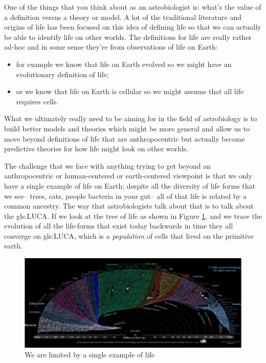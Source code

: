 \documentclass[]{article}
\begin{document}
One of the things that  you think about as
an astrobiologist is: what's the
value of a definition versus a theory or
model. A lot of the traditional
literature and origins of life has been
focused on this idea of defining life so
that we can actually be able to identify
life on other worlds. The definitions
for life are really rather ad-hoc and in
some sense they're  from
observations of life on Earth:
\begin{itemize}
	\item  for example we know that life on Earth evolved so we might have an evolutionary definition of life;
	\item or we know that life on Earth is cellular so we might assume that all life requires cells.
\end{itemize}

What we ultimately really need to be aiming for
in the field of astrobiology is to build
better models and theories which might
be more general and allow us to move
beyond definitions of life that are
anthropocentric but
actually become predictive theories for
how life might look on other worlds.

The challenge that we face with anything
trying to get beyond an anthropocentric
or human-centered or earth-centered
viewpoint is that we only have a single
example of life on Earth; despite all
the diversity of life forms that we see--
trees, cats, people bacteria in your gut--
all of that life is related by a common ancestry.
The way that astrobiologists talk
about that is to talk about
the \gls{gls:LUCA}.
If we look at the tree of life
as shown in Figure \ref{fig:yatol}, and we trace
the evolution of all the life-forms that
exist today backwards in time they all
converge on \gls{gls:LUCA}, which is a
\emph{population} of cells that lived on the
primitive earth.


\begin{figure}[H]
	\caption{We are limited by a single example of life}\label{fig:yatol}
	\includegraphics[width=\textwidth]{YATOL}
\end{figure}
\end{document}
